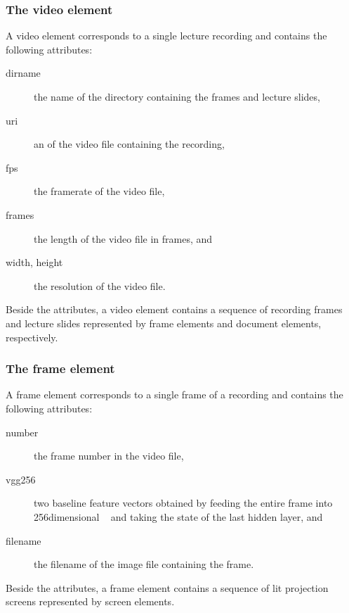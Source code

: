 \subsubsection*{The video element}
A video element corresponds to a single lecture recording and contains the
following attributes:
\begin{description}
  \item[dirname] the name of the directory containing the frames and lecture slides,
  \item[uri] an  of the video file containing the recording,
  \item[fps] the framerate of the video file,
  \item[frames] the length of the video file in frames, and
  \item[width\textmd, height] the resolution of the video file.
\end{description}
Beside the attributes, a video element contains a sequence of recording frames
and lecture slides represented by frame elements and document elements,
respectively.

\subsubsection*{The frame element}
A frame element corresponds to a single frame of a recording and contains the
following attributes:
\begin{description}
  \item[number] the frame number in the video file,
  \item[vgg256] two baseline feature vectors obtained by feeding the entire
    frame into 256dimensional ~\cite{simonyan2014very} and taking the state of the last hidden
    layer, and%
  \item[filename] the filename of the image file containing the frame.
\end{description}
Beside the attributes, a frame element contains a sequence of lit projection
screens represented by screen elements.

